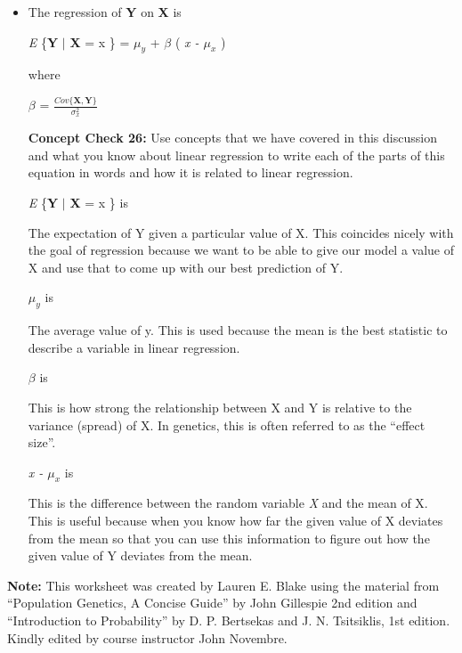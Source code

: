 \documentclass[12pt]{report}
\begin{document}
\begin{itemize}
\item The regression of \textbf{Y} on \textbf{X} is 


 \textit{E} \{\textbf{Y} $\mid$ \textbf{X} = x \} = $\mu_{y}$ + $\beta$ \big( \textit{x - $\mu_{x}$} \big)
 
\bigskip
where 

$\beta$ =  $\frac{Cov \{ \textbf{X},\textbf{Y} \} }{ \sigma_{x}^{2}} $

\bigskip
\textbf{Concept Check 26:} Use concepts that we have covered in this discussion and what you know about linear regression to write each of the parts of this equation in words and how it is related to linear regression. 

\bigskip  

\textit{E} \{\textbf{Y} $\mid$ \textbf{X} = x \} is 

\color{red} 

The expectation of Y given a particular value of X. This coincides nicely with the goal of regression because we want to be able to give our model a value of X and use that to come up with our best prediction of Y. 

\color{black}

$\mu_{y}$ is

\color{red} The average value of y. This is used because the mean is the best statistic to describe a variable in linear regression. \color{black}

$\beta$ is

\color{red} This is how strong the relationship between X and Y is relative to the variance (spread) of X. In genetics, this is often referred to as the ``effect size''. 

\color{black}

 \textit{x - $\mu_{x}$} is
 
\color{red} This is the difference between the random variable \textit{X} and the mean of X. This is useful because when you know how far the given value of X deviates from the mean so that you can use this information to figure out how the given value of Y deviates from the mean. 

\color{black}
 


\end{itemize}


\bigskip
\textbf{Note:} This worksheet was created by Lauren E. Blake using the material from ``Population Genetics, A Concise Guide'' by John Gillespie 2nd edition and ``Introduction to Probability'' by D. P. Bertsekas and J. N. Tsitsiklis, 1st edition. Kindly edited by course instructor John Novembre. 
\end{document}
